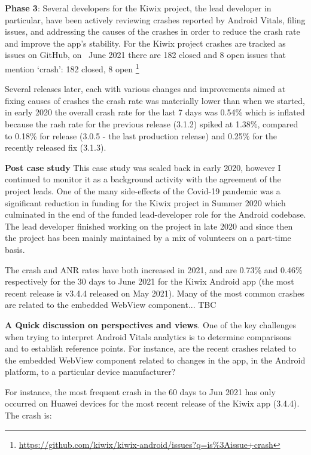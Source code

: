 \textbf{Phase 3}: Several developers for the Kiwix project, the lead developer in particular, have been actively reviewing crashes reported by Android Vitals, filing issues, and addressing the causes of the crashes in order to reduce the crash rate and improve the app's stability. For the Kiwix project crashes are tracked as issues on GitHub, on~ June 2021 there are 182 closed and 8 open issues that mention `crash': 182 closed, 8 open %
\footnote{\url{https://github.com/kiwix/kiwix-android/issues?q=is\%3Aissue+crash}}

Several releases later, each with various changes and improvements aimed at fixing causes of crashes the crash rate was materially lower than when we started, in early 2020 the overall crash rate for the last 7 days was 0.54\% which is inflated because the rash rate for the previous release (3.1.2) spiked at 1.38\%, compared to 0.18\% for release (3.0.5 -  the last production release) and 0.25\% for the recently released fix (3.1.3).

\textbf{Post case study}
This case study was scaled back in early 2020, however I continued to monitor it as a background activity with the agreement of the project leads. One of the many side-effects of the Covid-19 pandemic was a significant reduction in funding for the Kiwix project in Summer 2020 which culminated in the end of the funded lead-developer role for the Android codebase. The lead developer finished working on the project in late 2020 and since then the project has been mainly maintained by a mix of volunteers on a part-time basis. 

The crash and ANR rates have both increased in 2021, and are 0.73\% and 0.46\% respectively for the 30 days to  June 2021 for the Kiwix Android app (the most recent release is v3.4.4 released on  May 2021). Many of the most common crashes are related to the embedded WebView component... TBC

\textbf{A Quick discussion on perspectives and views}. 
One of the key challenges when trying to interpret Android Vitals analytics is to determine comparisons and to establish reference points. For instance, are the recent crashes related to the embedded WebView component related to changes in the app, in the Android platform, to a particular device manufacturer? 

For instance, the most frequent crash in the 60 days to  Jun 2021 has only occurred on Huawei devices for the most recent release of the Kiwix app (3.4.4). The crash is:

